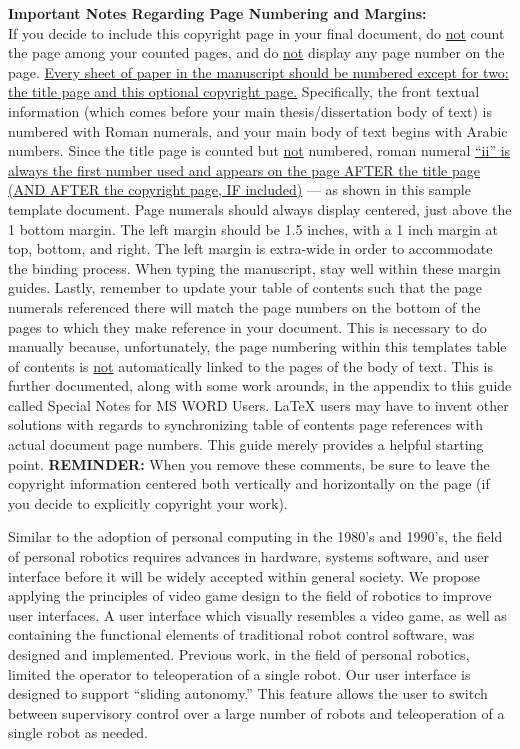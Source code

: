 \begin{thesiscopyrightpage}
\begin{singlespace}
{\small \textbf{Important Notes Regarding Page Numbering and Margins:}} \\
If you decide to include this copyright page in your final document, do
\uline{not} count the page among your counted pages, and do \uline{not} display
any page number on the page.  \uline{Every sheet of paper in the manuscript
should be numbered except for two:  the title page and this optional copyright
page.}  Specifically, the front textual information (which comes before your
main thesis/dissertation body of text) is numbered with Roman numerals, and
your main body of text begins with Arabic numbers.  Since the title page is
counted but \uline{not} numbered, roman numeral \uline{``ii'' is always the
first number used and appears on the page AFTER the title page (AND AFTER the
copyright page, IF included)} --- as shown in this sample template document.
Page numerals should always display centered, just above the 1 bottom margin.
The left margin should be 1.5 inches, with a 1 inch margin at top, bottom, and
right.  The left margin is extra-wide in order to accommodate the binding
process.  When typing the manuscript, stay well within these margin guides.
Lastly, remember to update your table of contents such that the page numerals
referenced there will match the page numbers on the bottom of the pages to
which they make reference in your document.  This is necessary to do manually
because, unfortunately, the page numbering within this templates table of
contents is \uline{not} automatically linked to the pages of the body of text.
This is further documented, along with some work arounds, in the appendix to
this guide called Special Notes for MS WORD Users.  \LaTeX{} users may have to
invent other solutions with regards to synchronizing table of contents page
references with actual document page numbers.  This guide merely provides a
helpful starting point.  \textbf{REMINDER:} When you remove these comments, be
sure to leave the copyright information centered both vertically and
horizontally on the page (if you decide to explicitly copyright your work).
\end{singlespace}
\fi
\end{thesiscopyrightpage}

\begin{thesisabstract}
Similar to the adoption of personal computing in the 1980's and 1990's, the field of personal robotics requires advances in hardware, systems software, and user interface before it will be widely accepted within general society. We propose applying the principles of video game design to the field of robotics to improve user interfaces. A user interface which visually resembles a video game, as well as containing the functional elements of traditional robot control software, was designed and implemented. Previous work, in the field of personal robotics, limited the operator to teleoperation of a single robot. Our user interface is designed to support ``sliding autonomy.'' This feature allows the user to switch between supervisory control over a large number of robots and teleoperation of a single robot as needed.
\end{thesisabstract}

